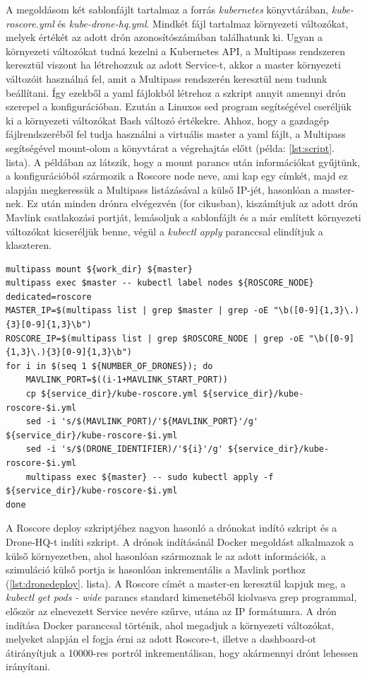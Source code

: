 \noindent
A megoldásom két sablonfájlt tartalmaz a forrás \emph{kubernetes} könyvtárában, \emph{kube-roscore.yml} és \emph{kube-drone-hq.yml}. Mindkét fájl tartalmaz környezeti változókat, melyek értékét az adott drón azonosítószámában találhatunk ki. Ugyan a környezeti változókat tudná kezelni a Kubernetes API, a Multipass rendszeren keresztül viszont ha létrehozzuk az adott Service-t, akkor a master környezeti változóit használná fel, amit a Multipass rendszerén keresztül nem tudunk beállítani. Így ezekből a yaml fájlokból létrehoz a szkript annyit amennyi drón szerepel a konfigurációban. Ezután a Linuxos sed program segítségével cseréljük ki a környezeti változókat Bash változó értékekre. Ahhoz, hogy a gazdagép fájlrendszeréből fel tudja használni a virtuális master a yaml fájlt, a Multipass segítségével mount-olom a könyvtárat a végrehajtás előtt (példa: \ref{lst:script}. lista). A példában az látszik, hogy a mount parancs után információkat gyűjtünk, a konfigurációból szármozik a Roscore node neve, ami kap egy címkét, majd ez alapján megkeressük a Multipass listázásával a külső IP-jét, hasonlóan a master-nek. Ez után minden drónra elvégezvén (for cikusban), kiszámítjuk az adott drón Mavlink csatlakozási portját, lemásoljuk a sablonfájlt és a már említett környezeti változókat kicseréljük benne, végül a \emph{kubectl apply} paranccsal elindítjuk a klaszteren. \\

\begin{lstlisting}[caption={Roscore információk összegyűjtése és deploy},label={lst:script}]
multipass mount ${work_dir} ${master}
multipass exec $master -- kubectl label nodes ${ROSCORE_NODE} dedicated=roscore
MASTER_IP=$(multipass list | grep $master | grep -oE "\b([0-9]{1,3}\.){3}[0-9]{1,3}\b")
ROSCORE_IP=$(multipass list | grep $ROSCORE_NODE | grep -oE "\b([0-9]{1,3}\.){3}[0-9]{1,3}\b")
for i in $(seq 1 ${NUMBER_OF_DRONES}); do
	MAVLINK_PORT=$((i-1+MAVLINK_START_PORT))
	cp ${service_dir}/kube-roscore.yml ${service_dir}/kube-roscore-$i.yml
	sed -i 's/$(MAVLINK_PORT)/'${MAVLINK_PORT}'/g' ${service_dir}/kube-roscore-$i.yml
	sed -i 's/$(DRONE_IDENTIFIER)/'${i}'/g' ${service_dir}/kube-roscore-$i.yml
	multipass exec ${master} -- sudo kubectl apply -f ${service_dir}/kube-roscore-$i.yml
done
\end{lstlisting}

\noindent
A Roscore deploy szkriptjéhez nagyon hasonló a drónokat indító szkript és a Drone-HQ-t indíti szkript. A drónok indításánál Docker megoldást alkalmazok a külső környezetben, ahol hasonlóan szármoznak le az adott információk, a szimuláció külső portja is hasonlóan inkrementális a Mavlink porthoz (\ref{lst:dronedeploy}. lista). A Roscore címét a master-en keresztül kapjuk meg, a \emph{kubectl get pods - wide} parancs standard kimenetéből kiolvasva grep programmal, először az elnevezett Service nevére szűrve, utána az IP formátumra. A drón indítása Docker paranccsal történik, ahol megadjuk a környezeti változókat, melyeket alapján el fogja érni az adott Roscore-t, illetve a dashboard-ot átirányítjuk a 10000-res portról inkrementálisan, hogy akármennyi drónt lehessen irányítani.

